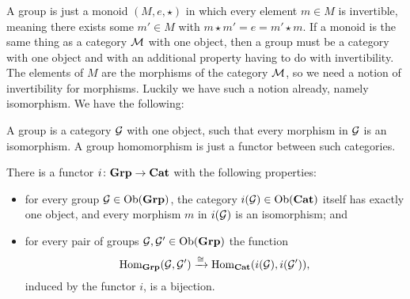 \documentclass[CT4S-EN-RU]{subfiles}
\begin{document}
\begin{blockRUS}
\end{blockRUS}



\subsubsection{}

\begin{blockENG}
A group is just a monoid $(M,e,\star)$ in which every element $m\in M$ is invertible, meaning there exists some $m'\in M$ with $m\star m'=e=m'\star m.$ If a monoid is the same thing as a category $\mathcal{M}$ with one object, then a group must be a category with one object and with an additional property having to do with invertibility. The elements of $M$ are the morphisms of the category $\mathcal{M}$, so we need a notion of invertibility for morphisms. Luckily we have such a notion already, namely isomorphism. We have the following:
\end{blockENG}

\begin{blockRUS}
\end{blockRUS}

\begin{sloganENG}
A group is a category $\mathcal{G}$ with one object, such that every morphism in $\mathcal{G}$ is an isomorphism. A group homomorphism is just a functor between such categories.
\end{sloganENG}

\begin{sloganRUS}
\end{sloganRUS}

\begin{theoremENG}\label{thm:grp to cat}
There is a functor $i\colon{\mathbf{Grp}}\rightarrow{\mathbf{Cat}}$ with the following properties:
\begin{itemize}
\item for every group $\mathcal{G}\in\textnormal{Ob}({\mathbf{Grp}})$, the category $i(\mathcal{G})\in\textnormal{Ob}({\mathbf{Cat}})$ itself has exactly one object, and every morphism $m$ in $i(\mathcal{G})$ is an isomorphism; and 
\item for every pair of groups $\mathcal{G},\mathcal{G}'\in\textnormal{Ob}({\mathbf{Grp}})$ the function $$\textnormal{Hom}_{\mathbf{Grp}}(\mathcal{G},\mathcal{G}')\xrightarrow{\cong}\textnormal{Hom}_{\mathbf{Cat}}(i(\mathcal{G}),i(\mathcal{G}')),$$ induced by the functor $i$, is a bijection.
\end{itemize}
\end{theoremENG}
\end{document}
